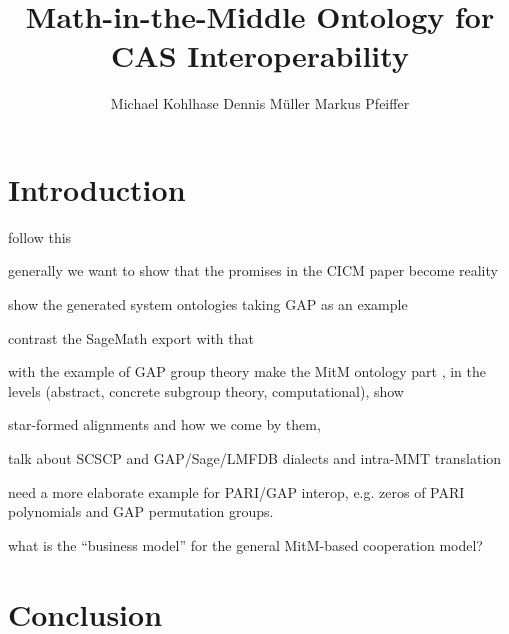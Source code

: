 \documentclass{llncs}
\title{Math-in-the-Middle Ontology for CAS Interoperability}
\author{
Michael Kohlhase\inst{1} 
Dennis M\"uller\inst{1} 
Markus Pfeiffer\inst{2} 
}
\institute{
   FAU Erlangen-N\"urnberg
   \and University of St~Andrews 
}
\begin{document}
\maketitle
\begin{abstract}
\end{abstract}

\section{Introduction}\label{sec:intro}
\begin{todolist}{follow this}
\item generally we want to show that the promises in the CICM paper become reality
\item show the generated system ontologies taking GAP as an example 
\item contrast the SageMath export with that 
\item with the example of GAP group theory make the MitM ontology part , in the levels
  (abstract, concrete subgroup theory, computational), show 
\item star-formed alignments and how we come by them, 
\item talk about SCSCP and GAP/Sage/LMFDB dialects and intra-MMT translation
\item need a more elaborate example for PARI/GAP interop, e.g. zeros of PARI polynomials and GAP
  permutation groups. 
\item what is the ``business model'' for the general MitM-based cooperation model? 
\end{todolist}
\section{Conclusion}\label{sec:concl}
\printbibliography
\end{document}
